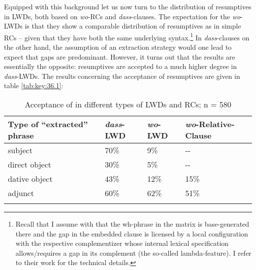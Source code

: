 \documentclass[output=paper]{langsci/langscibook}
\begin{document}
Equipped with this background let us now turn to the distribution of
resumptives in \glspl{LWD}, both based on \emph{wo}-\glspl{RC} and
\emph{dass}-clauses. The expectation for the \emph{wo}-\gls{LWD}s is that they
show a comparable distribution of resumptives as in simple \glspl{RC} – given
that they have both the same underlying syntax.\footnote{Recall that I assume
    with \citet{AdgRam2005} that the wh-phrase in the matrix is base-generated
    there and the gap in the embedded clause is licensed by a local
    configuration with the respective complementizer whose internal lexical
    specification allows/requires a gap in its complement (the so-called
    lambda-feature). I refer to their work for the technical details.} In
    \emph{dass}-clauses on the other hand, the assumption of an extraction strategy
    would one lead to expect that gaps are predominant.  However, it turns out
    that the results are essentially the opposite: resumptives are accepted to
    a much higher degree in \emph{dass}-\glspl{LWD}. The results concerning the
    acceptance of resumptives are given in table \eqref{tab:key:36.1}:

\begin{table}
\begin{tabularx}{\textwidth}{XXXX}
\lsptoprule
{Type of \enquote{extracted} phrase} & {\emph{dass}-LWD} & {\emph{wo}-LWD} & {\emph{wo}-Relative-Clause}\\
\midrule
{subject}  & {70\%} & {9\%} & {{}-{}-}\\
{direct object} & {30\%} & {5\%} & {{}-{}-}\\
{dative object} & {43\%} & {12\%} & {15\%}\\
{adjunct}  & {60\%} & {62\%} & {51\%}\\
\lspbottomrule
\end{tabularx}
\caption{Acceptance of  in different types of \glspl{LWD} and \glspl{RC};
n = 580}\label{tab:key:36.1}
\end{table}
\end{document}
